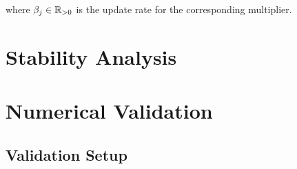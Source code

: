 \documentclass[letterpaper, journal]{IEEEtran}
\begin{document}
where $\beta_j \in \mathbb{R}_{>0}$ is the update rate for the corresponding multiplier.

\section{Stability Analysis}


\section{Numerical Validation}

\subsection{Validation Setup}
\end{document}
